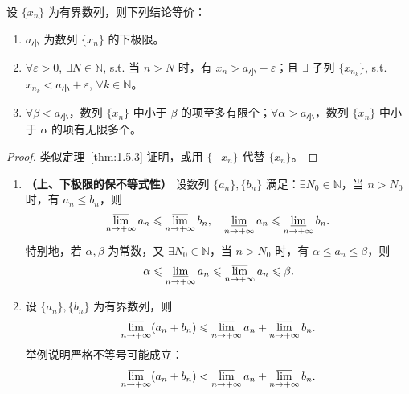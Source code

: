 \begin{theorem}\label{thm:1.5.4}
设 $\{x_n\}$ 为有界数列，则下列结论等价：
\begin{enumerate}
    \item $a_{\text{小}}$ 为数列 $\{x_n\}$ 的下极限。
    \item $\forall \varepsilon > 0$, $\exists N \in \mathbb{N}$, s.t. 当 $n > N$ 时，有 $x_n > a_{\text{小}} - \varepsilon$；且 $\exists$ 子列 $\{x_{n_k}\}$, s.t. $x_{n_k} < a_{\text{小}} + \varepsilon$, $\forall k \in \mathbb{N}$。
    \item $\forall \beta < a_{\text{小}}$，数列 $\{x_n\}$ 中小于 $\beta$ 的项至多有限个；$\forall \alpha > a_{\text{小}}$，数列 $\{x_n\}$ 中小于 $\alpha$ 的项有无限多个。
\end{enumerate}
\end{theorem}

\begin{proof}
类似定理~\ref{thm:1.5.3} 证明，或用 $\{-x_n\}$ 代替 $\{x_n\}$。
\end{proof}

\begin{theorem}\label{thm:1.5.5}
\begin{enumerate}
    \item \textbf{（上、下极限的保不等式性）} 设数列 $\{a_n\}, \{b_n\}$ 满足：$\exists N_0 \in \mathbb{N}$，当 $n > N_0$ 时，有 $a_n \leqslant b_n$，则
    \[
    \varlimsup_{n\to+\infty} a_n \leqslant \varlimsup_{n\to+\infty} b_n,\quad \varliminf_{n\to+\infty} a_n \leqslant \varliminf_{n\to+\infty} b_n.
\]
    特别地，若 $\alpha, \beta$ 为常数，又 $\exists N_0 \in \mathbb{N}$，当 $n > N_0$ 时，有 $\alpha \leqslant a_n \leqslant \beta$，则
    \[
    \alpha \leqslant \varliminf_{n\to+\infty} a_n \leqslant \varlimsup_{n\to+\infty} a_n \leqslant \beta.
\]
    \item 设 $\{a_n\}, \{b_n\}$ 为有界数列，则
    \[
    \varlimsup_{n\to+\infty} (a_n + b_n) \leqslant \varlimsup_{n\to+\infty} a_n + \varlimsup_{n\to+\infty} b_n.
\]
    举例说明严格不等号可能成立：
    \[
    \varlimsup_{n\to+\infty} (a_n + b_n) < \varlimsup_{n\to+\infty} a_n + \varlimsup_{n\to+\infty} b_n.
\]
\end{enumerate}
\end{theorem}

